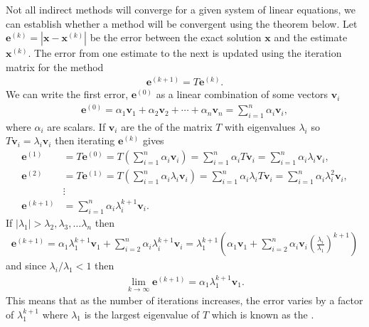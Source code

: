 \documentclass[letterpaper,10pt,english]{jupyterBook}
\begin{document}
\sphinxAtStartPar
Not all indirect methods will converge for a given system of linear equations, we can establish whether a method will be convergent using the theorem below. Let \(\mathbf{e}^{(k)} = |\mathbf{x} - \mathbf{x}^{(k)}|\) be the error between the exact solution \(\mathbf{x}\) and the estimate \(\mathbf{x}^{(k)}\). The error from one estimate to the next is updated using the iteration matrix for the method
\begin{align*}
    \mathbf{e}^{(k+1)} = T\mathbf{e}^{(k)}.
\end{align*}
\sphinxAtStartPar
We can write the first error, \(\mathbf{e}^{(0)}\) as a linear combination of some vectors \(\mathbf{v}_i\)
\begin{align*}
    \mathbf{e}^{(0)} =\alpha_1 \mathbf{v}_1 +\alpha_2 \mathbf{v}_2 +\cdots +\alpha_n \mathbf{v}_n =\sum_{i=1}^n \alpha_i \mathbf{v}_i,
\end{align*}
\sphinxAtStartPar
where \(\alpha_i\) are scalars. If \(\mathbf{v}_i\) are the  of the matrix \(T\) with eigenvalues \(\lambda_i\) so \(T\mathbf{v}_i = \lambda_i \mathbf{v}_i\) then iterating \(\mathbf{e}^{(k)}\) gives
\begin{align*}
    \mathbf{e}^{(1)} &= T\mathbf{e}^{(0)} =T\left(\sum_{i=1}^n \alpha_i \mathbf{v}_i \right)=\sum_{i=1}^n \alpha_i T\mathbf{v}_i = \sum_{i=1}^n \alpha_i \lambda_i \mathbf{v}_i , \\
    \mathbf{e}^{(2)} &=T\mathbf{e}^{(1)} =T\left(\sum_{i=1}^n \alpha_i \lambda_i \mathbf{v}_i \right)=\sum_{i=1}^n \alpha_i \lambda_i T\mathbf{v}_i =\sum_{i=1}^n \alpha_i \lambda_i^2 \mathbf{v}_i , \\
    &\vdots \\
    \mathbf{e}^{(k+1)} &=\sum_{i=1}^n \alpha_i \lambda_i^{k+1} \mathbf{v}_i .
\end{align*}
\sphinxAtStartPar
If \(|\lambda_1|>\lambda_2, \lambda_3, \ldots \lambda_n\) then
\begin{align*}
    \mathbf{e}^{(k+1)} =\alpha_1 \lambda_1^{k+1} \mathbf{v}_1 +\sum_{i=2}^n \alpha_i \lambda_i^{k+1} \mathbf{v}_i =\lambda_1^{k+1} \left(\alpha_1 \mathbf{v}_1 +\sum_{i=2}^n \alpha_i \mathbf{v}_i {\left(\frac{\lambda_i }{\lambda_1 }\right)}^{k+1} \right)
\end{align*}
\sphinxAtStartPar
and since \(\lambda_i / \lambda_ 1 < 1\) then
\begin{align*}
    \lim_{k\to \infty } \mathbf{e}^{(k+1)} =\alpha_1 \lambda_1^{k+1} \mathbf{v}_1 .
\end{align*}
\sphinxAtStartPar
This means that as the number of iterations increases, the error varies by a factor of \(\lambda_1^{k+1}\) where \(\lambda_1\) is the largest eigenvalue of \(T\) which is known as the .
\end{document}
